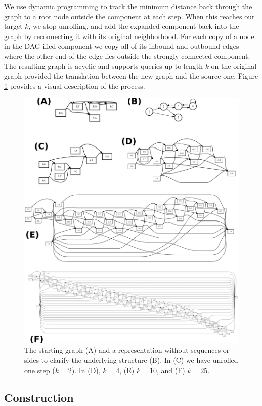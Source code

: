 \documentclass{article}
\begin{document}
We use dynamic programming to track the minimum distance back through the graph to a root node outside the component at each step.
When this reaches our target $k$, we stop unrolling, and add the expanded component back into the graph by reconnecting it with its original neighborhood.
For each copy of a node in the DAG-ified component we copy all of its inbound and outbound edges where the other end of the edge lies outside the strongly connected component.
The resulting graph is acyclic and supports queries up to length $k$ on the original graph provided the translation between the new graph and the source one.
Figure \ref{fig:kdagify} provides a visual description of the process.

\begin{figure}[t]
\centering
\includegraphics[width=1.0\textwidth]{figures/kdagify}
\caption{\label{fig:kdagify}
  The starting graph (A) and a representation without sequences or sides to clarify the underlying structure (B).
  In (C) we have unrolled one step ($k = 2$). In (D), $k = 4$, (E) $k = 10$, and (F) $k = 25$.
}
\end{figure}

\subsection{Construction}
\end{document}
